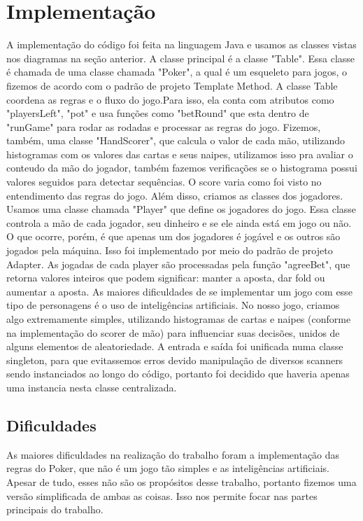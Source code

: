 \documentclass[12pt]{article}
\begin{document}
		\section{Implementação}
		A implementação do código foi feita na linguagem Java e usamos as classes vistas nos diagramas na seção anterior.
		A classe principal é a classe "Table". Essa classe é chamada de uma classe chamada "Poker", a qual é um
        esqueleto para jogos, o fizemos de acordo com o padrão de projeto Template Method. A classe Table coordena as
        regras e o fluxo do jogo.Para isso, ela conta com atributos como "playersLeft", "pot" e usa funções como
        "betRound" que esta dentro de "runGame" para rodar as rodadas e processar as regras do jogo.
		Fizemos, também, uma classe "HandScorer", que calcula o valor de cada mão, utilizando histogramas com os valores
        das cartas e seus naipes, utilizamos isso pra avaliar o conteudo da mão do jogador, também fazemos verificações
        se o histograma possui valores seguidos para detectar sequências. O score varia como foi visto no entendimento das
        regras do jogo.
		Além disso, criamos as classes dos jogadores. Usamos uma classe chamada "Player" que define os jogadores do jogo. Essa classe controla a mão de cada jogador, seu dinheiro e se ele ainda está em jogo ou não. O que ocorre, porém, é que apenas um dos jogadores é jogável e os outros são jogados pela máquina.
        Isso foi implementado por meio do padrão de projeto Adapter. As jogadas de cada player são processadas pela
        função "agreeBet", que retorna valores inteiros que podem significar: manter a aposta, dar fold ou aumentar a
        aposta. As maiores dificuldades de se implementar um jogo com esse tipo de personagens é o uso de inteligências
        artificiais. No nosso jogo, criamos algo extremamente simples, utilizando histogramas de cartas e naipes
        (conforme na implementação do scorer de mão) para influenciar suas decisões, unidos de alguns elementos de
        aleatoriedade.
        A entrada e saída foi unificada numa classe singleton, para que evitassemos erros devido manipulação de diversos
        scanners sendo instanciados ao longo do código, portanto foi decidido que haveria apenas uma instancia nesta
        classe centralizada.
        \subsection{Dificuldades}
        As maiores dificuldades na realização do trabalho foram a implementação das regras do Poker, que não é um jogo tão simples e as inteligências artificiais. Apesar de tudo, esses não são os propósitos desse trabalho, portanto fizemos uma versão simplificada de ambas as coisas. Isso nos permite focar nas partes principais do trabalho.
\end{document}

